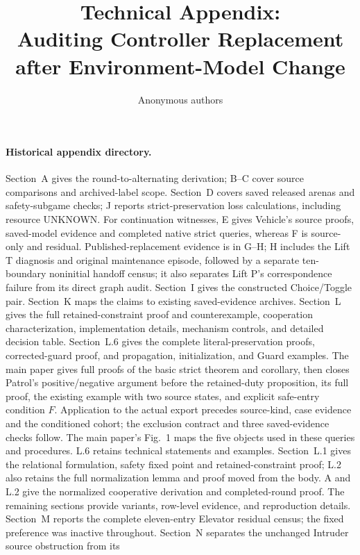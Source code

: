 \documentclass[11pt]{article}
\title{Technical Appendix:\\
Auditing Controller Replacement after Environment-Model Change}
\author{Anonymous authors}
\date{}
\begin{document}
\maketitle


\paragraph{Historical appendix directory.}
Section~A gives the round-to-alternating derivation; B--C cover source
comparisons and archived-label scope. Section~D covers saved released arenas
and safety-subgame checks; J reports strict-preservation loss calculations,
including resource UNKNOWN. For continuation witnesses, E gives Vehicle's
source proofs, saved-model evidence and completed native strict queries,
whereas F is source-only and residual.
Published-replacement evidence is in G--H; H includes the Lift T diagnosis
and original maintenance episode, followed by a separate ten-boundary
noninitial handoff census; it also separates Lift P's correspondence
failure from its direct graph audit. Section~I gives the
constructed Choice/Toggle pair. Section~K maps the claims to existing saved-evidence archives. Section~L
gives the full retained-constraint proof and counterexample, cooperation
characterization, implementation details, mechanism controls, and detailed
decision table. Section~L.6 gives the complete literal-preservation
proofs, corrected-guard proof, and propagation, initialization, and Guard
examples. The main paper gives full proofs of the basic strict theorem and
corollary, then closes Patrol's positive/negative argument before the
retained-duty proposition, its full proof, the existing example with two source states,
and explicit safe-entry condition $F$.
Application to the actual export precedes source-kind, case evidence and the
conditioned cohort; the exclusion contract and three saved-evidence checks follow.
The main paper's Fig.~1 maps the five objects used in these queries and procedures.
L.6 retains technical statements and examples. Section~L.1 gives the relational
formulation, safety fixed point and retained-constraint proof; L.2 also retains the full normalization
lemma and proof moved from the body. A and L.2 give the normalized
cooperative derivation and completed-round proof. The remaining sections
provide variants, row-level evidence, and reproduction details.
Section~M reports the complete eleven-entry Elevator residual census;
the fixed preference was inactive throughout.
Section~N separates the unchanged Intruder source obstruction from its
\end{document}
